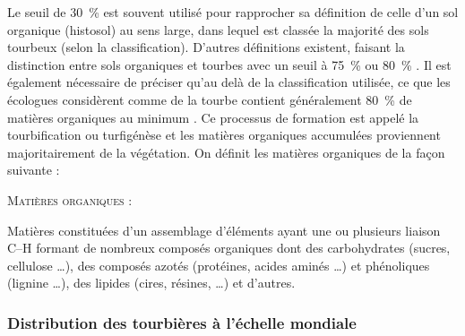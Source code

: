 Le seuil de \SI{30}{\percent} est souvent utilisé pour rapprocher sa définition de celle d'un sol organique (histosol) au sens large, dans lequel est classée la majorité des sols tourbeux (selon la classification).
D'autres définitions existent, faisant la distinction entre sols organiques et tourbes avec un seuil à \SI{75}{\percent} \citep{andrejko1983} ou \SI{80}{\percent} \citep{landva1983}.
Il est également nécessaire de préciser qu'au delà de la classification utilisée, ce que les écologues considèrent comme de la tourbe contient généralement \SI{80}{\percent} de matières organiques au minimum \citep{rydin2013b}.
Ce processus de formation est appelé la tourbification ou turfigénèse et les matières organiques accumulées proviennent majoritairement de la végétation.
On définit les matières organiques de la façon suivante : 
\begin{pdef}
\textsc{Matières organiques} :

Matières constituées d'un assemblage d'éléments ayant une ou plusieurs liaison C--H formant de nombreux composés organiques dont des carbohydrates (sucres, cellulose \dots), des composés azotés (protéines, acides aminés \dots) et phénoliques (lignine \dots), des lipides (cires, résines, \dots) et d'autres\footnotemark.

\end{pdef}


\subsubsection{Distribution des tourbières à l'échelle mondiale}

